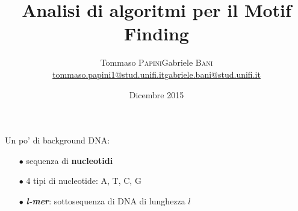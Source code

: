 



	\title[Motif Finding]{Analisi di algoritmi per il Motif Finding}
	\date[11 Dicembre 2015]{ Dicembre 2015}
	
	\author[Papini - Bani]{
		\begin{center}
			\begin{tabular}{lr}
				Tommaso \textsc{Papini}&Gabriele \textsc{Bani}\\
				\href{mailto:tommaso.papini1@stud.unifi.it}{tommaso.papini1@stud.unifi.it}&
				\href{mailto:gabriele.bani@stud.unifi.it}{gabriele.bani@stud.unifi.it}
			\end{tabular}
		\end{center}
	}
	
	\begin{frame}[plain]
		\titlepage
	\end{frame}
	
	\begin{frame}{Un po' di background}
		DNA:
		\begin{itemize}
			\item[$\bullet$] sequenza di \alert{\textbf{nucleotidi}}
			\item[$\bullet$] 4 tipi di nucleotide: A, T, C, G
			\item[$\bullet$] \alert{\textbf{\textit{l-mer}}}: sottosequenza di DNA di lunghezza $l$
		\end{itemize}
	\end{frame}
	
